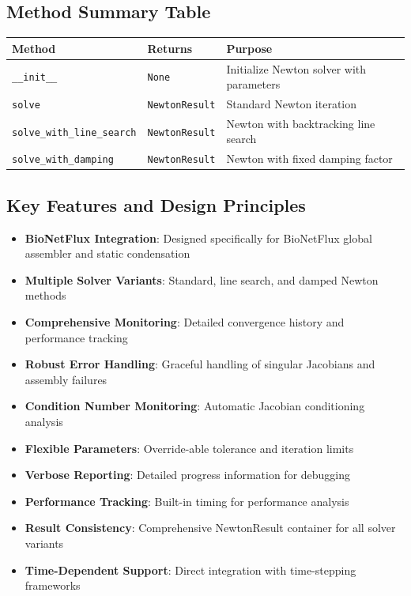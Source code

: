\subsection{Method Summary Table}

\begin{longtable}{|p{5.5cm}|p{4cm}|p{4.5cm}|}
\hline
\textbf{Method} & \textbf{Returns} & \textbf{Purpose} \\
\hline
\endhead

\texttt{\_\_init\_\_} & \texttt{None} & Initialize Newton solver with parameters \\
\hline

\texttt{solve} & \texttt{NewtonResult} & Standard Newton iteration \\
\hline

\texttt{solve\_with\_line\_search} & \texttt{NewtonResult} & Newton with backtracking line search \\
\hline

\texttt{solve\_with\_damping} & \texttt{NewtonResult} & Newton with fixed damping factor \\
\hline

\end{longtable}

\subsection{Key Features and Design Principles}

\begin{itemize}
    \item \textbf{BioNetFlux Integration}: Designed specifically for BioNetFlux global assembler and static condensation
    \item \textbf{Multiple Solver Variants}: Standard, line search, and damped Newton methods
    \item \textbf{Comprehensive Monitoring}: Detailed convergence history and performance tracking
    \item \textbf{Robust Error Handling}: Graceful handling of singular Jacobians and assembly failures
    \item \textbf{Condition Number Monitoring}: Automatic Jacobian conditioning analysis
    \item \textbf{Flexible Parameters}: Override-able tolerance and iteration limits
    \item \textbf{Verbose Reporting}: Detailed progress information for debugging
    \item \textbf{Performance Tracking}: Built-in timing for performance analysis
    \item \textbf{Result Consistency}: Comprehensive NewtonResult container for all solver variants
    \item \textbf{Time-Dependent Support}: Direct integration with time-stepping frameworks
\end{itemize}

